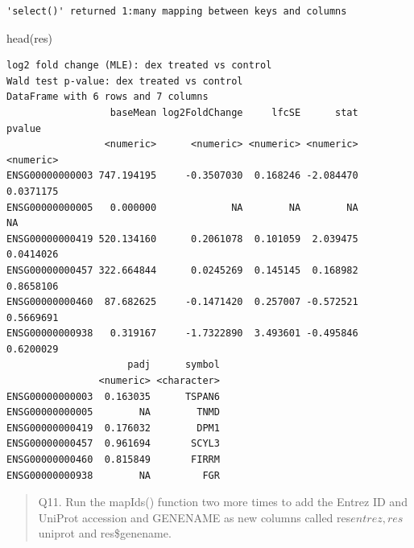 \documentclass[
  letterpaper,
  DIV=11,
  numbers=noendperiod]{scrartcl}
\newenvironment{Shaded}{\begin{snugshade}}{\end{snugshade}}
\newcommand{\AttributeTok}[1]{\textcolor[rgb]{0.40,0.45,0.13}{#1}}
\newcommand{\CommentTok}[1]{\textcolor[rgb]{0.37,0.37,0.37}{#1}}
\newcommand{\FunctionTok}[1]{\textcolor[rgb]{0.28,0.35,0.67}{#1}}
\newcommand{\NormalTok}[1]{\textcolor[rgb]{0.00,0.23,0.31}{#1}}
\newcommand{\OtherTok}[1]{\textcolor[rgb]{0.00,0.23,0.31}{#1}}
\newcommand{\SpecialCharTok}[1]{\textcolor[rgb]{0.37,0.37,0.37}{#1}}
\newcommand{\StringTok}[1]{\textcolor[rgb]{0.13,0.47,0.30}{#1}}
\begin{document}
\begin{verbatim}
'select()' returned 1:many mapping between keys and columns
\end{verbatim}

\begin{Shaded}
\begin{Highlighting}[]
\FunctionTok{head}\NormalTok{(res)}
\end{Highlighting}
\end{Shaded}

\begin{verbatim}
log2 fold change (MLE): dex treated vs control 
Wald test p-value: dex treated vs control 
DataFrame with 6 rows and 7 columns
                  baseMean log2FoldChange     lfcSE      stat    pvalue
                 <numeric>      <numeric> <numeric> <numeric> <numeric>
ENSG00000000003 747.194195     -0.3507030  0.168246 -2.084470 0.0371175
ENSG00000000005   0.000000             NA        NA        NA        NA
ENSG00000000419 520.134160      0.2061078  0.101059  2.039475 0.0414026
ENSG00000000457 322.664844      0.0245269  0.145145  0.168982 0.8658106
ENSG00000000460  87.682625     -0.1471420  0.257007 -0.572521 0.5669691
ENSG00000000938   0.319167     -1.7322890  3.493601 -0.495846 0.6200029
                     padj      symbol
                <numeric> <character>
ENSG00000000003  0.163035      TSPAN6
ENSG00000000005        NA        TNMD
ENSG00000000419  0.176032        DPM1
ENSG00000000457  0.961694       SCYL3
ENSG00000000460  0.815849       FIRRM
ENSG00000000938        NA         FGR
\end{verbatim}

\begin{quote}
Q11. Run the mapIds() function two more times to add the Entrez ID and
UniProt accession and GENENAME as new columns called
res\(entrez, res\)uniprot and res\$genename.
\end{quote}

\begin{Shaded}
\end{Shaded}
\end{document}
